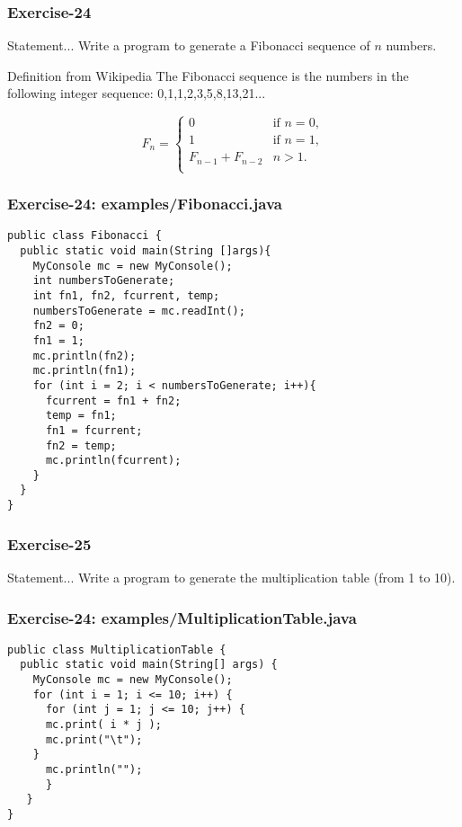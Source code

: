 \documentclass[xcolor=dvipsnames,dvip,notes=show,table]{beamer}
\begin{document}
\begin{frame}[fragile]
\frametitle{Exercise-24}
\begin{block}{Statement...}
Write a program to generate a Fibonacci sequence of $n$ numbers.
\end{block}
% 
\begin{exampleblock}{Definition from Wikipedia}
The Fibonacci sequence is the numbers in the following integer sequence:
0,1,1,2,3,5,8,13,21...
\end{exampleblock}


\begin{equation}
F_n = \begin{cases}
0 & \text{if } n = 0, \\
1 & \text{if } n = 1, \\
F_{n-1} + F_{n-2} & n > 1.\\
\end{cases}
\end{equation}



\end{frame}


\begin{frame}[fragile]
\frametitle{Exercise-24: examples/Fibonacci.java}
\scriptsize
\begin{lstlisting}
public class Fibonacci {
  public static void main(String []args){
    MyConsole mc = new MyConsole();
    int numbersToGenerate;
    int fn1, fn2, fcurrent, temp;
    numbersToGenerate = mc.readInt();
    fn2 = 0;
    fn1 = 1;
    mc.println(fn2);
    mc.println(fn1);
    for (int i = 2; i < numbersToGenerate; i++){
      fcurrent = fn1 + fn2;
      temp = fn1;
      fn1 = fcurrent;
      fn2 = temp;
      mc.println(fcurrent);
    }
  }
}
\end{lstlisting}
\end{frame}

\begin{frame}[fragile]
\frametitle{Exercise-25}
\begin{block}{Statement...}
Write a program to generate the multiplication table (from 1 to 10).
\end{block}
% 
\end{frame}

\begin{frame}[fragile]
\frametitle{Exercise-24: examples/MultiplicationTable.java}
\scriptsize
\begin{lstlisting}
public class MultiplicationTable {
  public static void main(String[] args) {
    MyConsole mc = new MyConsole();
    for (int i = 1; i <= 10; i++) {
      for (int j = 1; j <= 10; j++) {
	  mc.print( i * j );
	  mc.print("\t");
	}
      mc.println("");
      }
   }
}
\end{lstlisting}
\end{frame}
\end{document}
